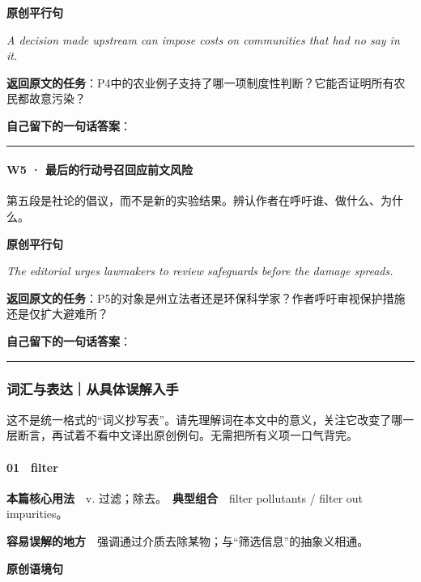 \documentclass[
  11pt,
]{ctexart}
\renewenvironment{quote}{\begin{tcolorbox}[enhanced,breakable,colback=sand,colframe=primary!22,boxrule=0.4pt,arc=2pt,left=2.6mm,right=2.6mm,top=1.6mm,bottom=1.6mm]\itshape}{\end{tcolorbox}}
\begin{document}
\textbf{原创平行句}

\begin{quote}
A decision made upstream can impose costs on communities that had no say
in it.
\end{quote}

\textbf{返回原文的任务}：P4中的农业例子支持了哪一项制度性判断？它能否证明所有农民都故意污染？

\textbf{自己留下的一句话答案}：

\rule{0.75\linewidth}{0.35pt}

\paragraph{W5 ·
最后的行动号召回应前文风险}\label{w5-ux6700ux540eux7684ux884cux52a8ux53f7ux53ecux56deux5e94ux524dux6587ux98ceux9669}

第五段是社论的倡议，而不是新的实验结果。辨认作者在呼吁谁、做什么、为什么。

\textbf{原创平行句}

\begin{quote}
The editorial urges lawmakers to review safeguards before the damage
spreads.
\end{quote}

\textbf{返回原文的任务}：P5的对象是州立法者还是环保科学家？作者呼吁审视保护措施还是仅扩大避难所？

\textbf{自己留下的一句话答案}：

\rule{0.75\linewidth}{0.35pt}

\subsubsection{词汇与表达｜从具体误解入手}\label{ux8bcdux6c47ux4e0eux8868ux8fbeux4eceux5177ux4f53ux8befux89e3ux5165ux624b}

这不是统一格式的``词义抄写表''。请先理解词在本文中的意义，关注它改变了哪一层断言，再试着不看中文译出原创例句。无需把所有义项一口气背完。

\paragraph{01　filter}\label{filter}

\textbf{本篇核心用法}　v. 过滤；除去。　\textbf{典型组合}　filter
pollutants / filter out impurities。

\textbf{容易误解的地方}　强调通过介质去除某物；与``筛选信息''的抽象义相通。

\textbf{原创语境句}
\end{document}
